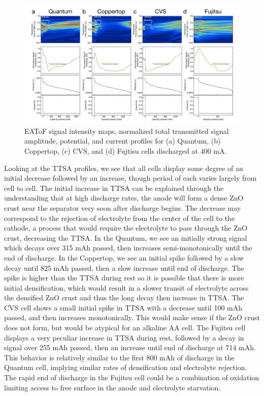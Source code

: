\begin{figure}[htb]
  \centering
    \includegraphics[width=\textwidth]{ch5-alkbw/images/BrandCompEAToF_400mA.png}
    \caption[EAToF results for multiple brands of alkaline AA cells discharged at 400 mA.]{EAToF signal intensity maps, normalized total transmitted signal amplitude, potential, and current profiles for (a) Quantum, (b) Coppertop, (c) CVS, and (d) Fujtisu cells discharged at 400 mA.}
    \label{fig:brand400}
\end{figure}

Looking at the TTSA profiles, we see that all cells display some degree of an initial decrease followed by an increase, though period of each varies largely from cell to cell. The initial increase in TTSA can be explained through the understanding that at high discharge rates, the anode will form a dense ZnO crust near the separator very soon after discharge begins. The decrease may correspond to the rejection of electrolyte from the center of the cell to the cathode, a process that would require the electrolyte to pass through the ZnO crust, decreasing the TTSA.  In the Quantum, we see an initially strong signal which decays over 315 mAh passed, then increases semi-monotonically until the end of discharge. In the Coppertop, we see an initial spike followed by a slow decay until 825 mAh passed, then a slow increase until end of discharge. The spike is higher than the TTSA during rest so it is possible that there is more initial densification, which would result in a slower transit of electrolyte across the densified ZnO crust and thus the long decay then increase in TTSA. The CVS cell shows a small initial spike in TTSA with a decrease until 100 mAh passed, and then increases monotonically. This would make sense if the ZnO crust does not form, but would be atypical for an alkaline AA cell. The Fujitsu cell displays a very peculiar increase in TTSA during rest, followed by a decay in signal over 255 mAh passed, then an increase until end of discharge at 714 mAh. This behavior is relatively similar to the first 800 mAh of discharge in the Quantum cell, implying similar rates of densification and electrolyte rejection. The rapid end of discharge in the Fujitsu cell could be a combination of oxidation limiting access to free surface in the anode and electrolyte starvation. 


